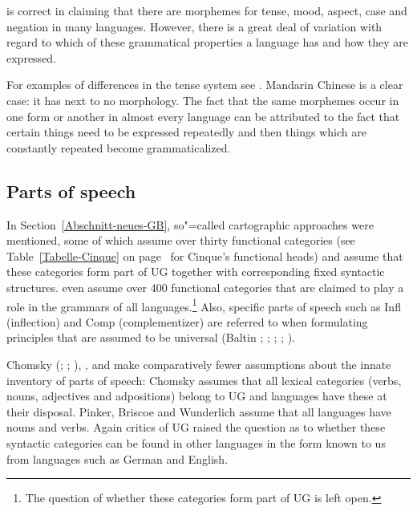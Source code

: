 \citet[]{Pinker94a} is correct in claiming that there are morphemes for tense, mood, aspect, case and negation in many languages. However, there is a great
deal of variation with regard to which of these grammatical properties a language has and
how they are expressed.

For examples of differences in the tense system see . Mandarin
Chinese is a clear case: it has next to no morphology. The fact that the same morphemes occur in one form or another in almost every language
can be attributed to the fact that certain things need to be expressed repeatedly and then things which are constantly repeated become grammaticalized.



\subsection{Parts of speech}
\label{Abschnitt-UG-Wortarten}

\addlines
In Section~\ref{Abschnitt-neues-GB}, so"=called cartographic approaches were mentioned, some of which assume over thirty functional categories
(see Table~\ref{Tabelle-Cinque} on page~\pageref{Tabelle-Cinque} for Cinque's functional heads) and assume that these categories form part of UG together with corresponding fixed syntactic structures.
\citet[, 57]{CR2010a} even assume over 400 functional categories
that are claimed to play a role in the grammars of all languages.\footnote{
	The question of whether these categories form part of UG is left open.
}
Also, specific parts of speech such as \mbox{Infl} (inflection) and
Comp (complementizer) are referred to when formulating principles that are assumed to be universal (Baltin \citeyear[]{Baltin81a}; \citeyear{Baltin2006a}; \citealp{Rizzi82b}; \citealp[]{Chomsky86b};
\citealp[]{Hornstein2013a}). 

Chomsky (\citeyear[]{Chomsky88a-u}; \citeyear{Chomsky91a-u};
\citeyear[]{Chomsky95a-u}), \citet[, 286]{Pinker94a}, \citet[]{Briscoe2000a} and
\citet[]{Wunderlich2004a} make comparatively fewer assumptions about the innate inventory of parts of speech:
Chomsky assumes that all lexical categories (verbs,  nouns,
adjectives and adpositions) belong to UG and languages have these at their disposal.
Pinker, Briscoe and Wunderlich assume that all languages have nouns and verbs.
Again critics of UG raised the question as to whether these syntactic categories can be found in other languages in the form known to us from languages such as German and English.

